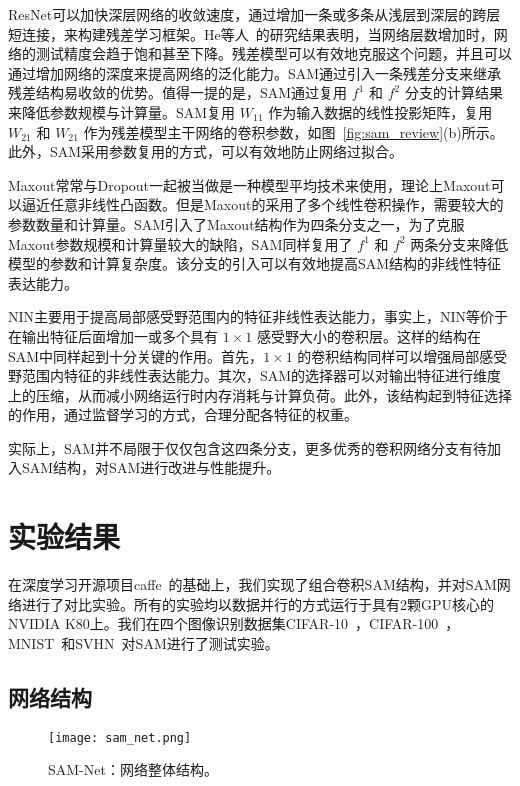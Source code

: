 ResNet可以加快深层网络的收敛速度，通过增加一条或多条从浅层到深层的跨层短连接，来构建残差学习框架。He等人~\cite{he2015deep}的研究结果表明，当网络层数增加时，网络的测试精度会趋于饱和甚至下降。残差模型可以有效地克服这个问题，并且可以通过增加网络的深度来提高网络的泛化能力。SAM通过引入一条残差分支来继承残差结构易收敛的优势。值得一提的是，SAM通过复用 $f^{1}$ 和 $f^{2}$ 分支的计算结果来降低参数规模与计算量。SAM复用 $W_{11}$ 作为输入数据的线性投影矩阵，复用 $W_{21}$ 和 $W_{21}$ 作为残差模型主干网络的卷积参数，如图~\ref{fig:sam_review}(b)所示。此外，SAM采用参数复用的方式，可以有效地防止网络过拟合。

Maxout常常与Dropout一起被当做是一种模型平均技术来使用，理论上Maxout可以逼近任意非线性凸函数。但是Maxout的采用了多个线性卷积操作，需要较大的参数数量和计算量。SAM引入了Maxout结构作为四条分支之一，为了克服Maxout参数规模和计算量较大的缺陷，SAM同样复用了 $f^{1}$ 和 $f^{2}$ 两条分支来降低模型的参数和计算复杂度。该分支的引入可以有效地提高SAM结构的非线性特征表达能力。

NIN主要用于提高局部感受野范围内的特征非线性表达能力，事实上，NIN等价于在输出特征后面增加一或多个具有 $1{\times}1$ 感受野大小的卷积层。这样的结构在SAM中同样起到十分关键的作用。首先，$1\times1$ 的卷积结构同样可以增强局部感受野范围内特征的非线性表达能力。其次，SAM的选择器可以对输出特征进行维度上的压缩，从而减小网络运行时内存消耗与计算负荷。此外，该结构起到特征选择的作用，通过监督学习的方式，合理分配各特征的权重。

实际上，SAM并不局限于仅仅包含这四条分支，更多优秀的卷积网络分支有待加入SAM结构，对SAM进行改进与性能提升。

\section{实验结果}
\label{sec:sap:experiment}

在深度学习开源项目caffe~\cite{jia2014caffe}的基础上，我们实现了组合卷积SAM结构，并对SAM网络进行了对比实验。所有的实验均以数据并行的方式运行于具有2颗GPU核心的NVIDIA K80上。我们在四个图像识别数据集CIFAR-10~\cite{krizhevsky2009learning}，CIFAR-100~\cite{krizhevsky2009learning}，MNIST~\cite{lecun1998gradient}和SVHN~\cite{netzer2011reading}对SAM进行了测试实验。

\subsection{网络结构}
\label{sec:sap:experiment:arc}

\begin{figure}[t]
\centering
\texttt{[image: sam\_net.png]}
\caption{SAM-Net：网络整体结构。}
\label{fig:net}
\end{figure}

